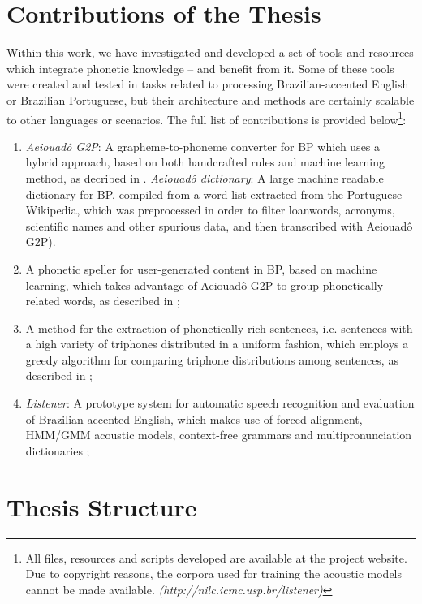 \section*{Contributions of the Thesis} 

Within this work, we have investigated and developed a set of tools and resources which integrate phonetic knowledge -- and benefit from it. Some of these tools were created and tested in tasks related to processing Brazilian-accented English or Brazilian Portuguese, but their architecture and methods are certainly scalable to other languages or scenarios. The full list of contributions is provided below\footnote{All files, resources and scripts developed are available at the project website. Due to copyright reasons, the corpora used for training the acoustic models cannot be made available.  \emph{(http://nilc.icmc.usp.br/listener)}}:

\begin{enumerate}
 \item \emph{Aeiouad\^o G2P}: A grapheme-to-phoneme converter for \ac{BP} which uses a hybrid approach, based on both handcrafted rules and machine learning method, as decribed in \citeauthor{Mendonca2014} \cite{Mendonca2014}. \emph{Aeiouad\^o dictionary}: A large machine readable dictionary for \ac{BP}, compiled from a word list extracted from the Portuguese Wikipedia, which was preprocessed in order to filter loanwords, acronyms, scientific names and other spurious data, and then transcribed with Aeiouad\^o G2P).
 \item A phonetic speller for user-generated content in \ac{BP}, based on machine learning, which takes advantage of Aeiouad\^o G2P to group phonetically related words, as described in \citeauthor{Mendonca2015} \cite{Mendonca2015}; 
 \item A method for the extraction of phonetically-rich sentences, i.e. sentences with a high variety of triphones distributed in a uniform fashion, which employs a greedy algorithm for comparing triphone distributions among sentences, as described in \citeauthor{Mendonca2014b} \cite{Mendonca2014b};
 \item \emph{Listener}: A prototype system for automatic speech recognition and evaluation of Brazilian-accented English, which makes use of forced alignment, \ac{HMM}/\ac{GMM} acoustic models, context-free grammars and multipronunciation dictionaries \cite{Mendonca2016};
\end{enumerate}

\section*{Thesis Structure}

